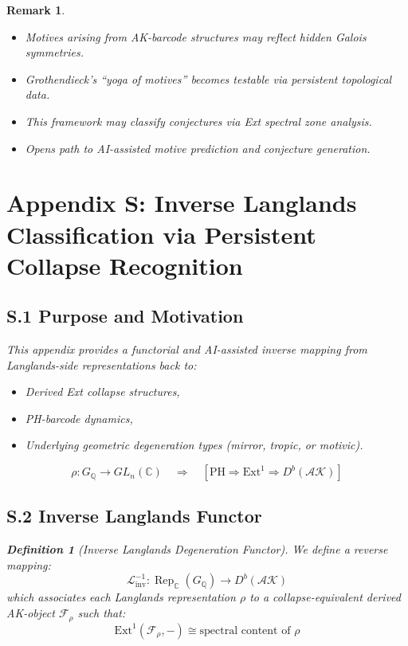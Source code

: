 \documentclass[11pt]{article}
\newtheorem{definition}[theorem]{Definition}
\newtheorem{remark}[theorem]{Remark}
\begin{document}
\begin{remark}
\begin{itemize}
  \item Motives arising from AK-barcode structures may reflect hidden Galois symmetries.
  \item Grothendieck’s “yoga of motives” becomes testable via persistent topological data.
  \item This framework may classify conjectures via Ext spectral zone analysis.
  \item Opens path to AI-assisted motive prediction and conjecture generation.
\end{itemize}


\section*{Appendix S: Inverse Langlands Classification via Persistent Collapse Recognition}

\subsection*{S.1 Purpose and Motivation}

This appendix provides a functorial and AI-assisted inverse mapping from Langlands-side representations back to:

\begin{itemize}
  \item Derived Ext collapse structures,
  \item PH-barcode dynamics,
  \item Underlying geometric degeneration types (mirror, tropic, or motivic).
\end{itemize}

\[
\boxed{
\rho: G_{\mathbb{Q}} \to GL_n(\mathbb{C})
\quad \Rightarrow \quad
[\text{PH} \Rightarrow \mathrm{Ext}^1 \Rightarrow D^b(\mathcal{AK})]
}
\]

\subsection*{S.2 Inverse Langlands Functor}

\begin{definition}[Inverse Langlands Degeneration Functor]
We define a reverse mapping:
\[
\mathcal{L}^{-1}_{\mathrm{inv}} : \operatorname{Rep}_{\mathbb{C}}(G_{\mathbb{Q}}) \to D^b(\mathcal{AK})
\]
which associates each Langlands representation \( \rho \) to a collapse-equivalent derived AK-object \( \mathcal{F}_\rho \) such that:
\[
\mathrm{Ext}^1(\mathcal{F}_\rho, -) \cong \text{spectral content of } \rho
\]
\end{definition}


\end{remark}
\end{document}
